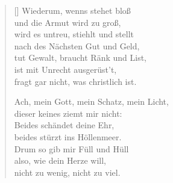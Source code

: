\begin{multicols}{2}
\begin{verse}[\versewidth]
 Wiederum, wenns stehet bloß\\
und die Armut wird zu groß,\\
wird es untreu, stiehlt und stellt\\
nach des Nächsten Gut und Geld,\\
tut Gewalt, braucht Ränk und List,\\
ist mit Unrecht ausgerüst't,\\
fragt gar nicht, was christlich ist.

 Ach, mein Gott, mein Schatz, mein Licht,\\
dieser keines ziemt mir nicht:\\
Beides schändet deine Ehr,\\
beides stürzt ins Höllenmeer.\\
Drum so gib mir Füll und Hüll\\
also, wie dein Herze will,\\
nicht zu wenig, nicht zu viel.

\end{verse}
\end{multicols}
